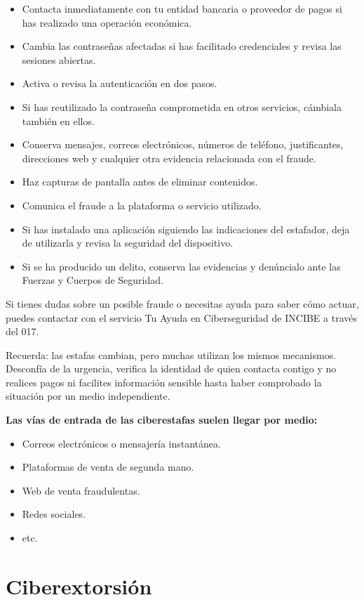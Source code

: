 \documentclass[
  spanish,
  a4paper,
  openany]{book}
\begin{document}
\begin{itemize}
\item
  Contacta inmediatamente con tu entidad bancaria o proveedor de pagos si has realizado una operación económica.
\item
  Cambia las contraseñas afectadas si has facilitado credenciales y revisa las sesiones abiertas.
\item
  Activa o revisa la autenticación en dos pasos.
\item
  Si has reutilizado la contraseña comprometida en otros servicios, cámbiala también en ellos.
\item
  Conserva mensajes, correos electrónicos, números de teléfono, justificantes, direcciones web y cualquier otra evidencia relacionada con el fraude.
\item
  Haz capturas de pantalla antes de eliminar contenidos.
\item
  Comunica el fraude a la plataforma o servicio utilizado.
\item
  Si has instalado una aplicación siguiendo las indicaciones del estafador, deja de utilizarla y revisa la seguridad del dispositivo.
\item
  Si se ha producido un delito, conserva las evidencias y denúncialo ante las Fuerzas y Cuerpos de Seguridad.
\end{itemize}

Si tienes dudas sobre un posible fraude o necesitas ayuda para saber cómo actuar, puedes contactar con el servicio Tu Ayuda en Ciberseguridad de INCIBE a través del 017.

Recuerda: las estafas cambian, pero muchas utilizan los mismos mecanismos. Desconfía de la urgencia, verifica la identidad de quien contacta contigo y no realices pagos ni facilites información sensible hasta haber comprobado la situación por un medio independiente.

\textbf{Las vías de entrada de las ciberestafas suelen llegar por medio:}

\begin{itemize}
\item
  Correos electrónicos o mensajería instantánea.
\item
  Plataformas de venta de segunda mano.
\item
  Web de venta fraudulentas.
\item
  Redes sociales.
\item
  etc.
\end{itemize}

\section{Ciberextorsión}\label{ciberextorsiuxf3n}
\end{document}

